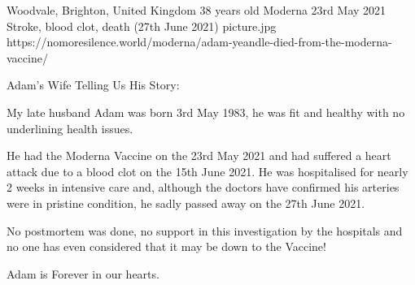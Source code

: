 {Woodvale, Brighton, United Kingdom}
{38 years old}
{Moderna}
{23rd May 2021}
{Stroke, blood clot, death (27th June 2021)}
{picture.jpg}
{https://nomoresilence.world/moderna/adam-yeandle-died-from-the-moderna-vaccine/}
{

Adam’s Wife Telling Us His Story:

My late husband Adam was born 3rd May 1983, he was fit and healthy with no
underlining health issues.

He had the Moderna Vaccine on the 23rd May 2021 and had suffered a heart attack
due to a blood clot on the 15th June 2021. He was hospitalised for nearly 2
weeks in intensive care and, although the doctors have confirmed his arteries
were in pristine condition, he sadly passed away on the 27th June 2021.

No postmortem was done, no support in this investigation by the hospitals and no
one has even considered that it may be down to the Vaccine!

Adam is Forever in our hearts.

}
